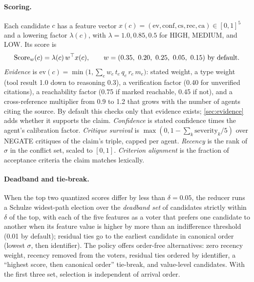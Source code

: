 \paragraph{Scoring.} Each candidate $c$ has a feature vector $x(c) = (\textrm{ev}, \textrm{conf}, \textrm{cs}, \textrm{rec}, \textrm{ca}) \in [0,1]^5$ and a lowering factor $\lambda(c)$, with $\lambda = 1.0, 0.85, 0.5$ for HIGH, MEDIUM, and LOW. Its score is
\begin{equation*}
  \mathrm{Score}_w(c) = \lambda(c)\, w^\top x(c), \qquad w = (0.35,\ 0.20,\ 0.25,\ 0.05,\ 0.15) \textrm{ by default.}
\end{equation*}
\emph{Evidence} is $\textrm{ev}(c) = \min\bigl(1, \sum_e w_e\, t_e\, q_e\, r_e\, m_e\bigr)$: stated weight, a type weight (tool result 1.0 down to reasoning 0.3), a verification factor (0.40 for unverified citations), a reachability factor (0.75 if marked reachable, 0.45 if not), and a cross-reference multiplier from 0.9 to 1.2 that grows with the number of agents citing the source. By default this checks only that evidence exists; \cref{sec:evidence} adds whether it supports the claim. \emph{Confidence} is stated confidence times the agent's calibration factor. \emph{Critique survival} is $\max(0, 1 - \sum_k \textrm{severity}_k / 5)$ over NEGATE critiques of the claim's triple, capped per agent. \emph{Recency} is the rank of $\sigma$ in the conflict set, scaled to $[0, 1]$. \emph{Criterion alignment} is the fraction of acceptance criteria the claim matches lexically.

\paragraph{Deadband and tie-break.} When the top two quantized scores differ by less than $\delta = 0.05$, the reducer runs a Schulze widest-path election \citep{schulze2011new} over the \emph{deadband set} of candidates strictly within $\delta$ of the top, with each of the five features as a voter that prefers one candidate to another when its feature value is higher by more than an indifference threshold (0.01 by default); residual ties go to the earliest candidate in canonical order (lowest $\sigma$, then identifier). The policy offers order-free alternatives: zero recency weight, recency removed from the voters, residual ties ordered by identifier, a ``highest score, then canonical order'' tie-break, and value-level candidates. With the first three set, selection is independent of arrival order.

